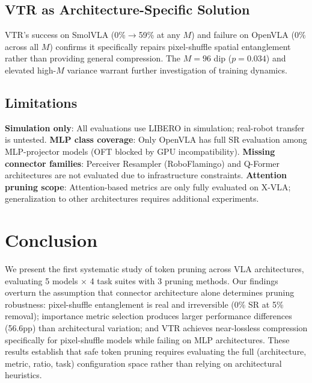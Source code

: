 \documentclass[letterpaper]{article}
\begin{document}
\subsection{VTR as Architecture-Specific Solution}

VTR's success on SmolVLA (0\%$\rightarrow$59\% at any $M$) and failure on OpenVLA (0\% across all $M$) confirms it specifically repairs pixel-shuffle spatial entanglement rather than providing general compression.
The $M=96$ dip ($p=0.034$) and elevated high-$M$ variance warrant further investigation of training dynamics.

\subsection{Limitations}

\textbf{Simulation only}: All evaluations use LIBERO in simulation; real-robot transfer is untested.
\textbf{MLP class coverage}: Only OpenVLA has full SR evaluation among MLP-projector models (OFT blocked by GPU incompatibility).
\textbf{Missing connector families}: Perceiver Resampler (RoboFlamingo) and Q-Former architectures are not evaluated due to infrastructure constraints.
\textbf{Attention pruning scope}: Attention-based metrics are only fully evaluated on X-VLA; generalization to other architectures requires additional experiments.

\section{Conclusion}

We present the first systematic study of token pruning across VLA architectures, evaluating 5 models $\times$ 4 task suites with 3 pruning methods.
Our findings overturn the assumption that connector architecture alone determines pruning robustness:
pixel-shuffle entanglement is real and irreversible (0\% SR at 5\% removal);
importance metric selection produces larger performance differences (56.6pp) than architectural variation;
and VTR achieves near-lossless compression specifically for pixel-shuffle models while failing on MLP architectures.
These results establish that safe token pruning requires evaluating the full (architecture, metric, ratio, task) configuration space rather than relying on architectural heuristics.
\end{document}
